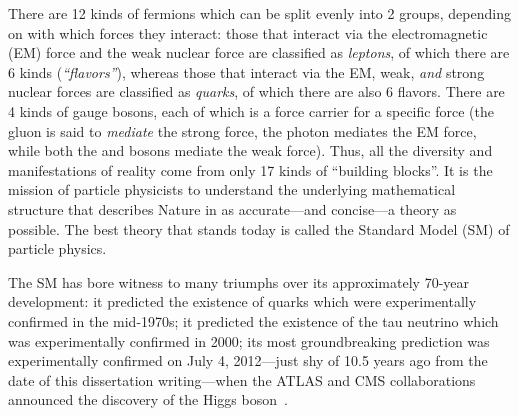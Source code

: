 There are 12 kinds of fermions which can be split evenly into 2 groups, depending on with which forces they interact:
those that interact via the electromagnetic (EM) force and the weak nuclear force are classified as \emph{leptons}, of which there are 6 kinds (\emph{``flavors''}),
whereas those that interact via the EM, weak, \emph{and} strong nuclear forces are classified as \emph{quarks}, of which there are also 6 flavors.
There are 4 kinds of gauge bosons, each of which is a force carrier for a specific force
(the gluon is said to \emph{mediate} the strong force, the photon mediates the EM force, while both the \PWpm and \PZ bosons mediate the weak force).
Thus, all the diversity and manifestations of reality come from only 17 kinds of ``building blocks''.
It is the mission of particle physicists to understand the underlying mathematical structure that describes Nature in as accurate---and concise---a theory as possible.
The best theory that stands today is called the Standard Model (SM) of particle physics.

The SM has bore witness to many triumphs over its approximately 70-year development:
it predicted the existence of quarks which were experimentally confirmed in the mid-1970s;
it predicted the existence of the tau neutrino which was experimentally confirmed in 2000;
its most groundbreaking prediction was experimentally confirmed on July 4, 2012---just shy of 10.5 years ago from the date of this dissertation writing---when the ATLAS and CMS collaborations announced the discovery of the Higgs boson~\cite{chatrchyan_observation_2012, chatrchyan_observation_2013, aad_observation_2012}.

